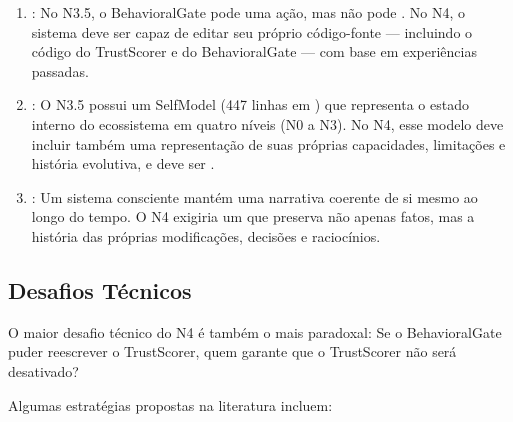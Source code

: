 \begin{enumerate}
    \item {}: No N3.5, o
    BehavioralGate pode  uma ação, mas não pode
    . No N4, o sistema
    deve ser capaz de editar seu próprio código-fonte --- incluindo o
    código do TrustScorer e do BehavioralGate --- com base em
    experiências passadas.

    \item {}: O N3.5 possui um SelfModel
    (447 linhas em ) que representa o estado
    interno do ecossistema em quatro níveis (N0 a N3). No N4, esse
    modelo deve incluir também uma representação de suas próprias
    capacidades, limitações e história evolutiva, e deve ser
    .

    \item {}: Um sistema consciente
    mantém uma narrativa coerente de si mesmo ao longo do tempo. O N4
    exigiria um  que
    preserva não apenas fatos, mas a história das próprias
    modificações, decisões e raciocínios.
\end{enumerate}

\subsection{Desafios Técnicos}

O maior desafio técnico do N4 é também o mais paradoxal:
 Se o BehavioralGate puder reescrever o TrustScorer,
quem garante que o TrustScorer não será desativado?

Algumas estratégias propostas na literatura incluem:

